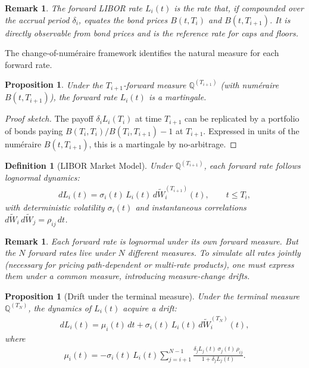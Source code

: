 \documentclass{report}
\theoremstyle{spacedplain}
\newtheorem{proposition}[theorem]{Proposition}
\theoremstyle{spaceddefinition}
\newtheorem{definition}[theorem]{Definition}
\theoremstyle{spacedremark}
\newtheorem{remark}[theorem]{Remark}
\begin{document}
\begin{remark}
The forward LIBOR rate $L_i(t)$ is the rate that, if compounded over the accrual period $\delta_i$, equates the bond prices $B(t,T_i)$ and $B(t,T_{i+1})$. It is directly observable from bond prices and is the reference rate for caps and floors.
\end{remark}

The change-of-num\'eraire framework identifies the natural measure for each forward rate.

\begin{proposition}
Under the $T_{i+1}$-forward measure $\mathbb{Q}^{(T_{i+1})}$ (with num\'eraire $B(t,T_{i+1})$), the forward rate $L_i(t)$ is a martingale.
\end{proposition}

\begin{proof}[Proof sketch]
The payoff $\delta_i L_i(T_i)$ at time $T_{i+1}$ can be replicated by a portfolio of bonds paying $B(T_i,T_i)/B(T_i,T_{i+1}) - 1$ at $T_{i+1}$. Expressed in units of the num\'eraire $B(t,T_{i+1})$, this is a martingale by no-arbitrage.
\end{proof}

\begin{definition}[LIBOR Market Model]
Under $\mathbb{Q}^{(T_{i+1})}$, each forward rate follows lognormal dynamics:
\begin{align}
    dL_i(t) = \sigma_i(t)\,L_i(t)\,d\widetilde{W}_i^{(T_{i+1})}(t), \qquad t \leq T_i,
\end{align}
with deterministic volatility $\sigma_i(t)$ and instantaneous correlations $d\widetilde{W}_i\,d\widetilde{W}_j = \rho_{ij}\,dt$.
\end{definition}

\begin{remark}
Each forward rate is lognormal under its own forward measure. But the $N$ forward rates live under $N$ different measures. To simulate all rates jointly (necessary for pricing path-dependent or multi-rate products), one must express them under a common measure, introducing measure-change drifts.
\end{remark}

\begin{proposition}[Drift under the terminal measure]
Under the terminal measure $\mathbb{Q}^{(T_N)}$, the dynamics of $L_i(t)$ acquire a drift:
\begin{align}
    dL_i(t) = \mu_i(t)\,dt + \sigma_i(t)\,L_i(t)\,d\widetilde{W}_i^{(T_N)}(t),
\end{align}
where
\begin{align}
    \mu_i(t) = -\sigma_i(t)\,L_i(t)\sum_{j=i+1}^{N-1}\frac{\delta_j L_j(t)\,\sigma_j(t)\,\rho_{ij}}{1 + \delta_j L_j(t)}.
\end{align}
\end{proposition}
\end{document}
